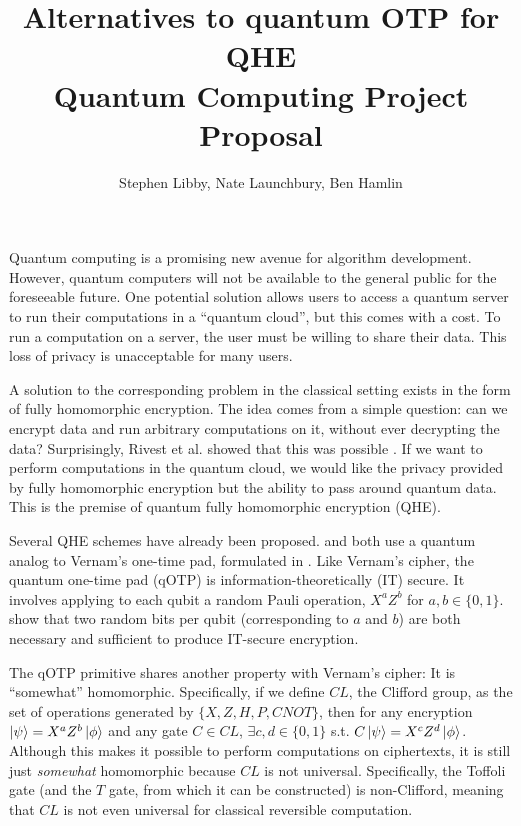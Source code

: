 \documentclass{article}
\title{Alternatives to quantum OTP for QHE \\
\normalsize Quantum Computing Project Proposal}
\author{Stephen Libby, Nate Launchbury, Ben Hamlin}
\date{}
\begin{document}
\maketitle

Quantum computing is a promising new avenue for algorithm development. However,
quantum computers will not be available to the general public for the
foreseeable future. One potential solution allows users to access a quantum
server to run their computations in a ``quantum cloud'', but this comes with a
cost. To run a computation on a server, the user must be willing to share their
data. This loss of privacy is unacceptable for many users.

A solution to the corresponding problem in the classical setting exists in the
form of fully homomorphic encryption. The idea comes from a simple question:
can we encrypt data and run arbitrary computations on it, without ever
decrypting the data? Surprisingly, Rivest et al. showed that this was possible
\cite{rivest1978}. If we want to perform computations in the quantum cloud, we
would like the privacy provided by fully homomorphic encryption but the ability
to pass around quantum data. This is the premise of quantum fully homomorphic
encryption (QHE).

Several QHE schemes have already been proposed. \citet{broadbent2015} and
\citet{dulek2016} both use a quantum analog to Vernam’s one-time pad, formulated
in \citet{ambainis2000}. Like Vernam’s cipher, the quantum one-time pad (qOTP)
is information-theoretically (IT) secure. It involves applying to each qubit a
random Pauli operation, $X^aZ^b$ for $a,b \in \{0,1\}$. \citet{ambainis2000}
show that two random bits per qubit (corresponding to $a$ and $b$) are both
necessary and sufficient to produce IT-secure encryption.

The qOTP primitive shares another property with Vernam’s cipher: It is
``somewhat'' homomorphic. Specifically, if we define $CL$, the Clifford group, as
the set of operations generated by $\{X,Z,H,P,CNOT\}$, then for any encryption
$\left\vert{\psi}\right\rangle = X^aZ^b\left\vert{\phi}\right\rangle$ and any gate $C \in CL$, $\exists c,d \in
\{0,1\}$ s.t. $C\left\vert{\psi}\right\rangle = X^cZ^d\left\vert{\phi}\right\rangle$. Although this makes it possible
to perform computations on ciphertexts, it is still just \textit{somewhat}
homomorphic because $CL$ is not universal. Specifically, the Toffoli gate (and
the $T$ gate, from which it can be constructed) is non-Clifford, meaning that
$CL$ is not even universal for classical reversible computation.
\end{document}
